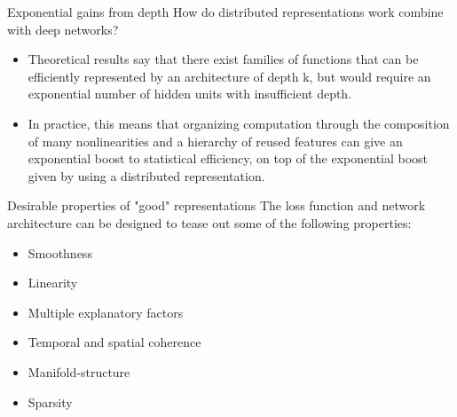 \begin{frame}{Exponential gains from depth}
How do distributed representations work combine with deep networks? \linebreak

\begin{itemize}
	\item Theoretical results say that there exist families of functions that can be efficiently represented by an architecture of depth k, but would require an exponential number of hidden units with insufficient depth. 
	\item In practice, this means that organizing computation through the composition of many nonlinearities and a hierarchy of reused features can give an exponential boost to statistical efficiency, on top of the exponential boost given by using a distributed representation.
\end{itemize}
\end{frame} 

\begin{frame}{Desirable properties of "good" representations}
The loss function and network architecture can be designed to tease out some of the following properties: 

\begin{itemize}
	\item Smoothness
	\item Linearity
	\item Multiple explanatory factors
	\item Temporal and spatial coherence
	\item Manifold-structure
	\item Sparsity
\end{itemize}

\end{frame}

